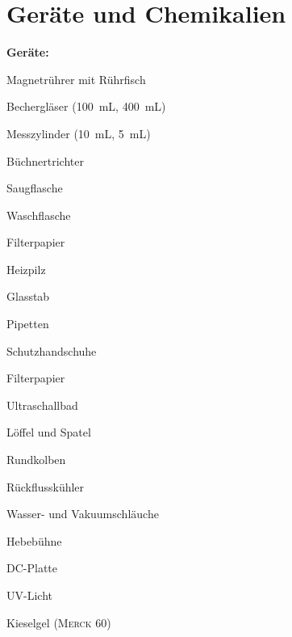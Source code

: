 \newpage
\section{Geräte und Chemikalien}
\label{sec:geraete}

\textbf{Geräte:}
\begin{itemize}
	\begin{minipage}{0.5\textwidth}
		\item Magnetrührer mit Rührfisch
		\item Bechergläser (\SI{100}{\milli \liter}, \SI{400}{\milli \liter})
		\item Messzylinder (\SI{10}{\milli \liter}, \SI{5}{\milli \liter})
		\item Büchnertrichter
		\item Saugflasche
		\item Waschflasche
		\item Filterpapier
		\item Heizpilz
		\item Glasstab
		\item Pipetten
		\item Schutzhandschuhe
	\end{minipage}
	\begin{minipage}{0.5\textwidth}
		\item Filterpapier
		\item Ultraschallbad
		\item Löffel und Spatel
		\item Rundkolben
		\item Rückflusskühler
		\item Wasser- und Vakuumschläuche
		\item Hebebühne
		\item DC-Platte
		\item UV-Licht
		\item Kieselgel (\textsc{Merck} 60)
	\end{minipage}
\end{itemize}

